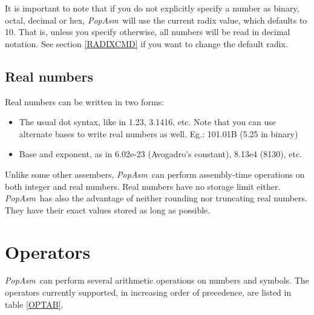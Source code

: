 \documentclass[a4paper,12pt]{book}
\newcommand{\popasm}{\emph{PopAsm}}
\begin{document}
It is important to note that if you do not explicitly specify a number
as binary, octal, decimal or hex, \popasm\ will use the current radix
value, which defaults to 10. That is, unless you specify otherwise, all
numbers will be read in decimal notation. See section \ref{RADIXCMD} if
you want to change the default radix.

\section{Real numbers}
Real numbers can be written in two forms:

\begin{itemize}
\item{The usual dot syntax}, like in 1.23, 3.1416, etc. Note that you can
use alternate bases to write real numbers as well. Eg.: 101.01B (5.25 in binary)
\item{Base and exponent}, as in 6.02e-23 (Avogadro\'{}s constant), 8.13e4 (8130),
etc.
\end{itemize}

Unlike some other assembers, \popasm\ can perform assembly-time operations
on both integer and real numbers. Real numbers have no storage limit either.
\popasm\ has also the advantage of neither rounding nor truncating real numbers.
They have their exact values stored as long as possible.

\chapter{Operators}
\popasm\ can perform several arithmetic operations on numbers and symbols. The
operators currently supported, in increasing order of precedence, are listed in
table \ref{OPTAB}.
\end{document}
